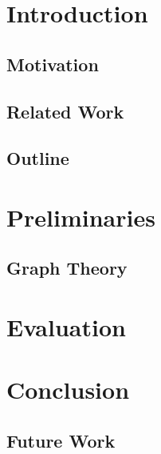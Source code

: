
\chapter{Introduction}
\label{ch:Introduction}

\section{Motivation}
\label{sec:Introduction:Motivation}

\section{Related Work}
\label{sec:Introduction:RelatedWork}

\section{Outline}
\label{sec:Introduction:Overview}




\chapter{Preliminaries}
\label{ch:Preliminaries}

\section{Graph Theory}
\label{sec:Preliminaries:GraphTheory}




\chapter{Evaluation}
\label{ch:Evaluation}




\chapter{Conclusion}
\label{ch:Conclusion}

\section{Future Work}
\label{sec:OrderComputation:FutureWork}
